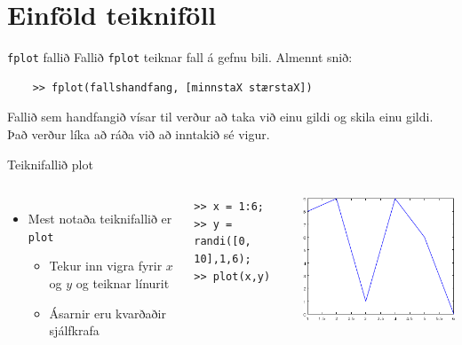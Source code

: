 \documentclass{beamer}
\begin{document}
\section{Einföld teikniföll}

\begin{frame}[fragile]{\texttt{fplot} fallið}
    Fallið \texttt{fplot} teiknar fall á gefnu bili. Almennt snið:
    \begin{verbatim}
    >> fplot(fallshandfang, [minnstaX stærstaX])
    \end{verbatim}
    Fallið sem handfangið vísar til verður að taka við einu gildi og skila einu gildi. Það verður líka að ráða við að inntakið sé vigur.
\end{frame}

\begin{frame}[fragile]{Teiknifallið plot}
    \begin{columns}
        \begin{itemize}
            \item Mest notaða teiknifallið er \texttt{plot}
            \begin{itemize}
                \item Tekur inn vigra fyrir $x$ og $y$ og teiknar línurit
                \item Ásarnir eru kvarðaðir sjálfkrafa
            \end{itemize}
        \end{itemize}
\begin{verbatim}
>> x = 1:6;
>> y = randi([0, 10],1,6);
>> plot(x,y)
\end{verbatim}
\includegraphics[width=\linewidth]{../T1a/Pics/plot-example5}
\end{columns}
\end{frame}
\end{document}

